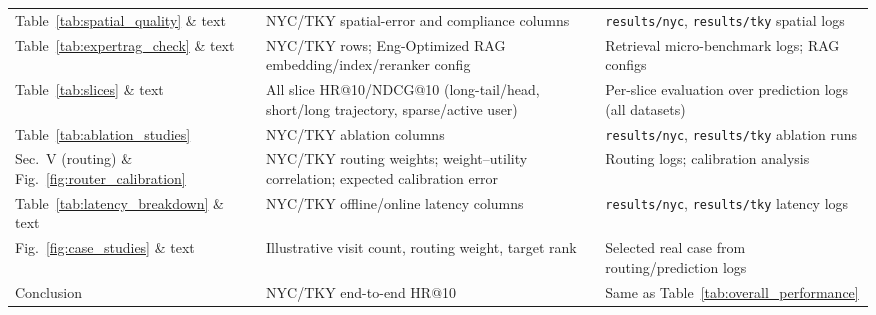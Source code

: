 \documentclass[journal]{IEEEtran}
\begin{document}
\begin{table}[!t]
\begin{tabular}{p{}p{}p{}}
Table~\ref{tab:spatial_quality} \& text & NYC/TKY spatial-error and compliance columns & \texttt{results/nyc}, \texttt{results/tky} spatial logs \\
Table~\ref{tab:expertrag_check} \& text & NYC/TKY rows; Eng-Optimized RAG embedding/index/reranker config & Retrieval micro-benchmark logs; RAG configs \\
Table~\ref{tab:slices} \& text & All slice HR@10/NDCG@10 (long-tail/head, short/long trajectory, sparse/active user) & Per-slice evaluation over prediction logs (all datasets) \\
Table~\ref{tab:ablation_studies} & NYC/TKY ablation columns & \texttt{results/nyc}, \texttt{results/tky} ablation runs \\
Sec.~V (routing) \& Fig.~\ref{fig:router_calibration} & NYC/TKY routing weights; weight--utility correlation; expected calibration error & Routing logs; calibration analysis \\
Table~\ref{tab:latency_breakdown} \& text & NYC/TKY offline/online latency columns & \texttt{results/nyc}, \texttt{results/tky} latency logs \\
Fig.~\ref{fig:case_studies} \& text & Illustrative visit count, routing weight, target rank & Selected real case from routing/prediction logs \\
Conclusion & NYC/TKY end-to-end HR@10 & Same as Table~\ref{tab:overall_performance} \\ \bottomrule
\end{tabular}
\end{table}



\end{document}
